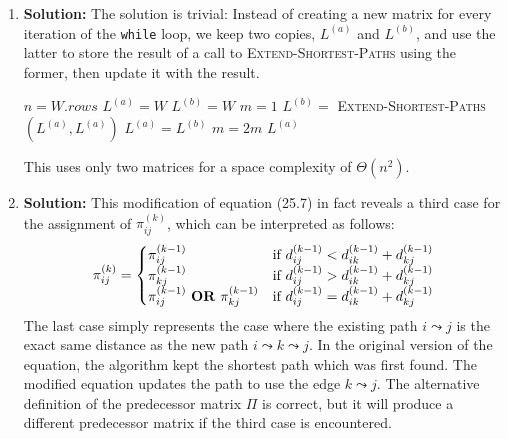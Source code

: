 \documentclass{article}
\begin{document}
\begin{enumerate}
\item \textbf{Solution:} 
The solution is trivial: Instead of creating a new matrix for every iteration of the \texttt{while} loop, we keep two copies, $L^{(a)}$ and $L^{(b)}$, and use the latter to store the result of a call to \textsc{Extend-Shortest-Paths} using the former, then update it with the result.
\begin{algorithm}[H]
\caption{}
\begin{algorithmic}
\STATE $n = W.rows$
\STATE $L^{(a)} = W$
\STATE $L^{(b)} = W$
\STATE $m=1$
    \STATE $L^{(b)}=$ \textsc{Extend-Shortest-Paths}$(L^{(a)},L^{(a)})$
    \STATE $L^{(a)} = L^{(b)}$
    \STATE $m=2m$
\ENDWHILE
\RETURN $L^{(a)}$
\end{algorithmic}
\end{algorithm}
This uses only two matrices for a space complexity of $\Theta(n^2)$.
\item \textbf{Solution:} 
This modification of equation (25.7) in fact reveals a third case for the assignment of $\pi_{ij}^{(k)}$, which can be interpreted as follows:
\begin{equation*}
\pi_{ij}^{(k)}=
    \begin{cases}
        \text{$\pi_{ij}^{(k-1)}$} & \text{if $d_{ij}^{(k-1)} < d_{ik}^{(k-1)} + d_{kj}^{(k-1)}$}\\
        \text{$\pi_{kj}^{(k-1)}$} & \text{if $d_{ij}^{(k-1)} > d_{ik}^{(k-1)} + d_{kj}^{(k-1)}$}\\
        \text{$\pi_{ij}^{(k-1)}$ \textbf{OR} $\pi_{kj}^{(k-1)}$} & \text{if $d_{ij}^{(k-1)} = d_{ik}^{(k-1)} + d_{kj}^{(k-1)}$}\\
    \end{cases}
\end{equation*}
The last case simply represents the case where the existing path $i \leadsto j$ is the exact same distance as the new path $i \leadsto k \leadsto j$. In the original version of the equation, the algorithm kept the shortest path which was first found. The modified equation updates the path to use the edge $k \leadsto j$. The alternative definition of the predecessor matrix $\Pi$ is correct, but it will produce a different predecessor matrix if the third case is encountered.


\end{enumerate}
\end{document}
